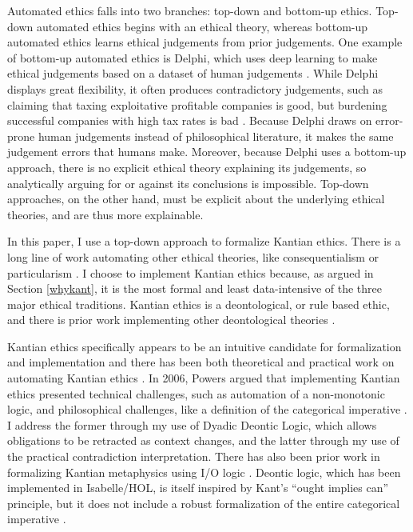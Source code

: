 \begin{isabellebody}
\begin{isamarkuptext}
Automated ethics falls into two branches: top-down and bottom-up ethics. Top-down automated ethics begins 
with an ethical theory, whereas bottom-up automated ethics learns ethical judgements from prior 
judgements. One example of bottom-up automated ethics is Delphi, which uses deep learning to make 
ethical judgements based on a dataset of human judgements \citep{delphi}. While Delphi displays great 
flexibility, it often produces contradictory judgements, such as claiming that taxing exploitative 
profitable companies is good, but burdening successful companies with high tax rates is bad \citep{verge}. 
Because Delphi draws on error-prone human judgements instead of philosophical literature, it makes 
the same judgement errors that humans make. Moreover, because Delphi uses a bottom-up approach, 
there is no explicit ethical theory explaining its judgements, so analytically arguing for or 
against its conclusions is impossible. Top-down approaches, on the other hand, must be explicit about 
the underlying ethical theories, and are thus more explainable. 

In this paper, I use a top-down approach to formalize Kantian ethics. There is a long line of work 
automating other ethical theories, like consequentialism \citep{util1, util2} or particularism 
\citep{particularism1, particularism2}. I choose to implement Kantian ethics because, as argued in 
Section \ref{whykant}, it is the most formal and least data-intensive of the three major ethical 
traditions. Kantian ethics is a deontological, or rule based ethic, and there is prior work 
implementing other deontological theories \citep{dde, deon1, deon2}. 

Kantian ethics specifically appears to be an intuitive candidate for formalization and implementation 
and there has been both theoretical and practical work on automating Kantian ethics \citep{powers, lin}. 
In 2006, Powers argued that implementing Kantian ethics presented technical challenges, 
such as automation of a non-monotonic logic, and philosophical challenges, like a definition of the 
categorical imperative \citep{powers}. I address the former through my use of Dyadic Deontic Logic, which allows 
obligations to be retracted as context changes, and the latter through my use of the practical 
contradiction interpretation. There has also been prior work in formalizing Kantian metaphysics 
using I/O logic \citep{io}. Deontic logic, which has been implemented in Isabelle/HOL, is itself inspired 
by Kant's ``ought implies can'' principle, but it does not include a robust formalization of the entire 
categorical imperative \citep{cresswell}.


\end{isamarkuptext}
\end{isabellebody}
